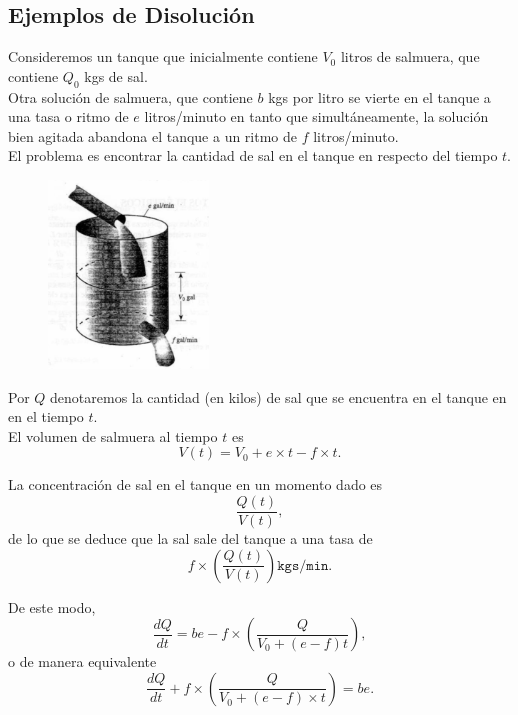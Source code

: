 \subsection{Ejemplos de Disolución}


	Consideremos un tanque que inicialmente contiene $V_{0}$ litros de salmuera, que contiene $Q_{0}$ kgs de sal.\\

	Otra solución de salmuera, que contiene $b$ kgs por litro se vierte en el tanque a una tasa o ritmo de $e$ litros/minuto en tanto que simultáneamente, la solución bien agitada abandona el tanque a un ritmo de $f$ litros/minuto.\\

	El problema es encontrar la cantidad de sal en el tanque en respecto del tiempo $t.$



	\begin{figure}
		\centering
		\includegraphics[height=5cm,keepaspectratio=true]{./edo/img020506.png}
		\label{fig:020506}
	\end{figure}





	Por $Q$ denotaremos la cantidad (en kilos) de sal que se encuentra en el tanque en en el tiempo $t.$\\

	El volumen de salmuera al tiempo $t$ es
	\[
		\label{bron:7.7}
		V(t)=V_{0}+e\times t-f\times t.
	\]




	La concentración de sal en el tanque en un momento dado es $$\dfrac{Q(t)}{V(t)},$$ de lo que se deduce que la sal sale del tanque a una tasa de
	$$
	f \times \left( \dfrac{Q(t)}{V(t)} \right)
	\texttt{kgs/min.}
	$$



	De este modo,
	$$
	\dfrac{dQ}{dt}=be-f\times \left( \dfrac{Q}{V_{0}+(e-f)t} \right),
	$$
	o de manera equivalente
	\[
		\label{bron:7.8}
		\dfrac{dQ}{dt}+f \times \left( \dfrac{Q}{V_{0}+(e-f)\times t} \right)=be.
	\]




